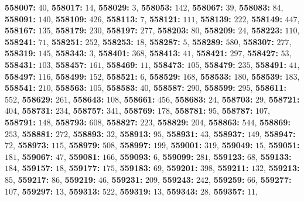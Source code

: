 \textsf{\bfseries 558007:} $40$, \textsf{\bfseries 558017:} $14$, \textsf{\bfseries 558029:} $3$, \textsf{\bfseries 558053:} $142$, \textsf{\bfseries 558067:} $39$, \textsf{\bfseries 558083:} $84$, \textsf{\bfseries 558091:} $140$, \textsf{\bfseries 558109:} $426$, \textsf{\bfseries 558113:} $7$, \textsf{\bfseries 558121:} $111$, \textsf{\bfseries 558139:} $222$, \textsf{\bfseries 558149:} $447$, \textsf{\bfseries 558167:} $135$, \textsf{\bfseries 558179:} $230$, \textsf{\bfseries 558197:} $277$, \textsf{\bfseries 558203:} $80$, \textsf{\bfseries 558209:} $24$, \textsf{\bfseries 558223:} $110$, \textsf{\bfseries 558241:} $71$, \textsf{\bfseries 558251:} $252$, \textsf{\bfseries 558253:} $18$, \textsf{\bfseries 558287:} $5$, \textsf{\bfseries 558289:} $580$, \textsf{\bfseries 558307:} $277$, \textsf{\bfseries 558319:} $145$, \textsf{\bfseries 558343:} $3$, \textsf{\bfseries 558401:} $368$, \textsf{\bfseries 558413:} $41$, \textsf{\bfseries 558421:} $297$, \textsf{\bfseries 558427:} $53$, \textsf{\bfseries 558431:} $103$, \textsf{\bfseries 558457:} $161$, \textsf{\bfseries 558469:} $11$, \textsf{\bfseries 558473:} $105$, \textsf{\bfseries 558479:} $235$, \textsf{\bfseries 558491:} $41$, \textsf{\bfseries 558497:} $116$, \textsf{\bfseries 558499:} $152$, \textsf{\bfseries 558521:} $6$, \textsf{\bfseries 558529:} $168$, \textsf{\bfseries 558533:} $180$, \textsf{\bfseries 558539:} $183$, \textsf{\bfseries 558541:} $210$, \textsf{\bfseries 558563:} $105$, \textsf{\bfseries 558583:} $40$, \textsf{\bfseries 558587:} $290$, \textsf{\bfseries 558599:} $295$, \textsf{\bfseries 558611:} $552$, \textsf{\bfseries 558629:} $261$, \textsf{\bfseries 558643:} $108$, \textsf{\bfseries 558661:} $456$, \textsf{\bfseries 558683:} $24$, \textsf{\bfseries 558703:} $29$, \textsf{\bfseries 558721:} $404$, \textsf{\bfseries 558731:} $234$, \textsf{\bfseries 558757:} $341$, \textsf{\bfseries 558769:} $178$, \textsf{\bfseries 558781:} $95$, \textsf{\bfseries 558787:} $107$, \textsf{\bfseries 558791:} $148$, \textsf{\bfseries 558793:} $608$, \textsf{\bfseries 558827:} $223$, \textsf{\bfseries 558829:} $204$, \textsf{\bfseries 558863:} $544$, \textsf{\bfseries 558869:} $253$, \textsf{\bfseries 558881:} $272$, \textsf{\bfseries 558893:} $32$, \textsf{\bfseries 558913:} $95$, \textsf{\bfseries 558931:} $43$, \textsf{\bfseries 558937:} $149$, \textsf{\bfseries 558947:} $72$, \textsf{\bfseries 558973:} $115$, \textsf{\bfseries 558979:} $508$, \textsf{\bfseries 558997:} $199$, \textsf{\bfseries 559001:} $319$, \textsf{\bfseries 559049:} $15$, \textsf{\bfseries 559051:} $181$, \textsf{\bfseries 559067:} $47$, \textsf{\bfseries 559081:} $166$, \textsf{\bfseries 559093:} $6$, \textsf{\bfseries 559099:} $281$, \textsf{\bfseries 559123:} $68$, \textsf{\bfseries 559133:} $184$, \textsf{\bfseries 559157:} $18$, \textsf{\bfseries 559177:} $175$, \textsf{\bfseries 559183:} $69$, \textsf{\bfseries 559201:} $398$, \textsf{\bfseries 559211:} $132$, \textsf{\bfseries 559213:} $85$, \textsf{\bfseries 559217:} $86$, \textsf{\bfseries 559219:} $46$, \textsf{\bfseries 559231:} $209$, \textsf{\bfseries 559243:} $242$, \textsf{\bfseries 559259:} $66$, \textsf{\bfseries 559277:} $107$, \textsf{\bfseries 559297:} $13$, \textsf{\bfseries 559313:} $522$, \textsf{\bfseries 559319:} $13$, \textsf{\bfseries 559343:} $28$, \textsf{\bfseries 559357:} $11$, 
